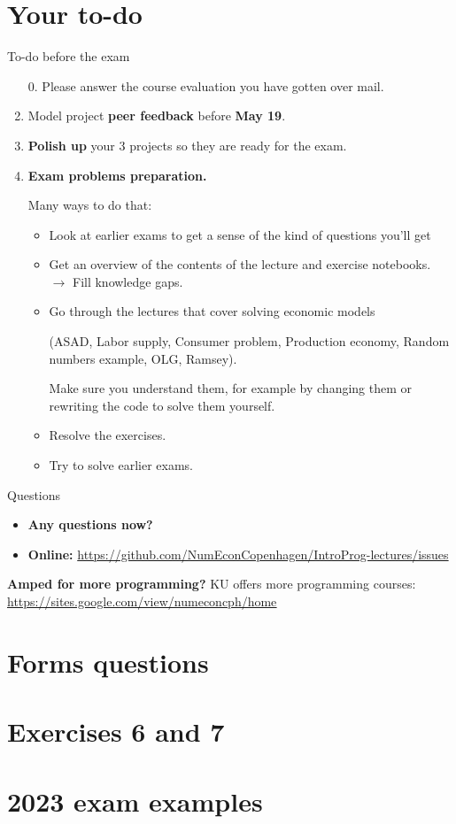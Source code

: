 \documentclass[10pt,english,t,aspectratio=169]{beamer}
\begin{document}
\section{Your to-do}
\begin{frame}{To-do before the exam}
    \begin{enumerate}
        \item[0.] Please answer the course evaluation you have gotten over mail.
        \item Model project \textbf{peer feedback} before \textbf{May 19}.
        \item \textbf{Polish up} your 3 projects so they are ready for the exam. 
        \item \textbf{Exam problems preparation.} \par
        Many ways to do that:
        \begin{itemize}
            \item Look at earlier exams to get a sense of the kind of questions you'll get
            \item Get an overview of the contents of the lecture and exercise notebooks. $\rightarrow$ Fill knowledge gaps.
            \item Go through the lectures that cover solving economic models \par 
            (ASAD, Labor supply, Consumer problem, Production economy,  Random numbers example, OLG, Ramsey). \par 
            Make sure you understand them, for example by changing them or rewriting the code to solve them yourself.
            \item Resolve the exercises.
            \item Try to solve earlier exams.
        \end{itemize}
    \end{enumerate}
\end{frame}



\begin{frame}{Questions}
\begin{itemize}
\item \textbf{Any questions now?}
\item \textbf{Online: }\href{https://github.com/NumEconCopenhagen/IntroProg-lectures/issues}{https://github.com/NumEconCopenhagen/IntroProg-lectures/issues}
\end{itemize}

\vfill
\textbf{Amped for more programming?} KU offers more programming courses: \underline{\href{https://sites.google.com/view/numeconcph/home}{https://sites.google.com/view/numeconcph/home}}
\end{frame}
%



\section{Forms questions}


\section{Exercises 6 and 7}

\section{2023 exam examples}
\end{document}
